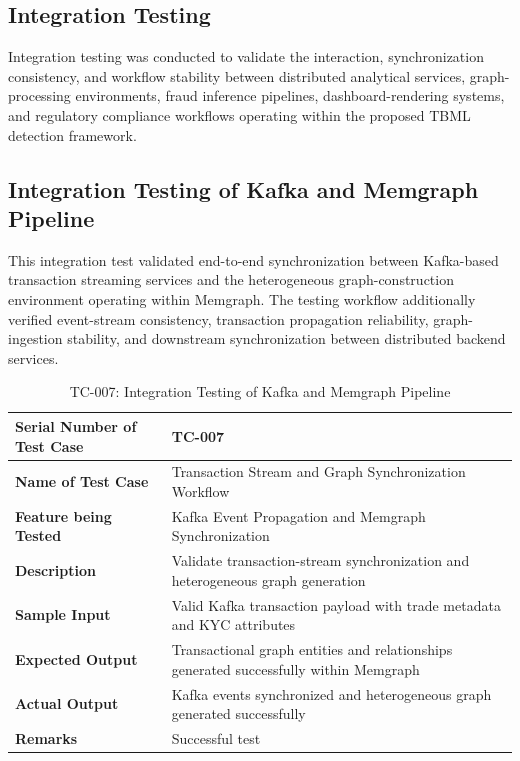 \subsection[Integration Testing]{\textbf{Integration Testing}}

Integration testing was conducted to validate the interaction, synchronization consistency, and workflow stability between distributed analytical services, graph-processing environments, fraud inference pipelines, dashboard-rendering systems, and regulatory compliance workflows operating within the proposed TBML detection framework.

\subsection[Integration Testing of Kafka and Memgraph Pipeline]{\textbf{Integration Testing of Kafka and Memgraph Pipeline}}

This integration test validated end-to-end synchronization between Kafka-based transaction streaming services and the heterogeneous graph-construction environment operating within Memgraph. The testing workflow additionally verified event-stream consistency, transaction propagation reliability, graph-ingestion stability, and downstream synchronization between distributed backend services.

\renewcommand{\arraystretch}{1.3}

\begin{table}[H]
\centering
\caption{TC-007: Integration Testing of Kafka and Memgraph Pipeline}
\label{tab:kafka_memgraph_integration_test}
\vspace{0.2cm}

\begin{tabular}{|p{4.2cm}|p{9cm}|}
\hline
\textbf{Serial Number of Test Case} & TC-007 \\ \hline
\textbf{Name of Test Case} & Transaction Stream and Graph Synchronization Workflow \\ \hline
\textbf{Feature being Tested} & Kafka Event Propagation and Memgraph Synchronization \\ \hline
\textbf{Description} & Validate transaction-stream synchronization and heterogeneous graph generation \\ \hline
\textbf{Sample Input} & Valid Kafka transaction payload with trade metadata and KYC attributes \\ \hline
\textbf{Expected Output} & Transactional graph entities and relationships generated successfully within Memgraph \\ \hline
\textbf{Actual Output} & Kafka events synchronized and heterogeneous graph generated successfully \\ \hline
\textbf{Remarks} & Successful test \\ \hline
\end{tabular}
\end{table}

